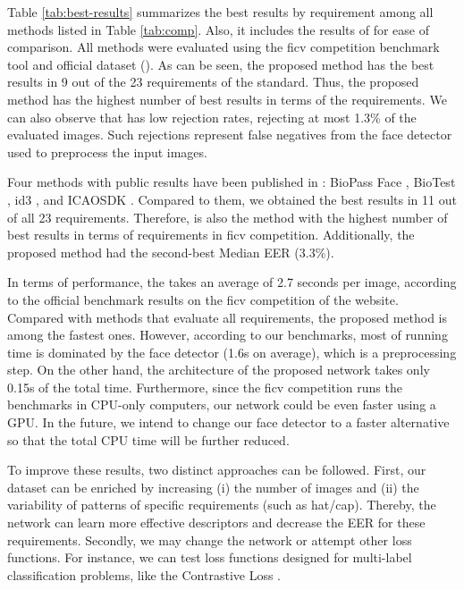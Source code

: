 Table \ref{tab:best-results} summarizes the best results by requirement among all methods listed in Table \ref{tab:comp}. Also, it includes the results of \methodname for ease of comparison. All methods were evaluated using the \acs{ficv} competition benchmark tool and official dataset (\ficvofficial). As can be seen, the proposed method has the best results in 9 out of the 23 requirements of the \icao standard. Thus, the proposed method has the highest number of best results in terms of the requirements. We can also observe that \methodname has low rejection rates, rejecting at most 1.3\% of the evaluated images. Such rejections represent false negatives from the face detector used to preprocess the input images.
 

 
Four methods with public results have been published in \fvcongoing: BioPass Face \citep{fvcVsoft}, BioTest \citep{fvcBioTest}, id3 \citep{fvcICAOCompliance}, and ICAOSDK \citep{fvcSeamfix}. Compared to them, we obtained the best results in 11 out of all 23 requirements. Therefore, \methodname is also the method with the highest number of best results in terms of requirements in \acs{ficv} competition. Additionally, the proposed method had the second-best Median EER (3.3\%).
 
In terms of performance, the \methodname takes an average of 2.7 seconds per image, according to the official benchmark results on the \acs{ficv} competition of the \fvcongoing website. Compared with methods that evaluate all requirements, the proposed method is among the fastest ones. However, according to our benchmarks, most of running time is dominated by the face detector (1.6s on average), which is a preprocessing step. On the other hand, the architecture of the proposed network takes only 0.15s of the total time. Furthermore, since the \acs{ficv} competition runs the benchmarks in CPU-only computers, our network could be even faster using a GPU. In the future, we intend to change our face detector to a faster alternative so that the total CPU time will be further reduced.
 
To improve these results, two distinct approaches can be followed. First, our dataset can be enriched by increasing (i) the number of images and (ii) the variability of patterns of specific requirements (such as hat/cap). Thereby, the network can learn more effective descriptors and decrease the EER for these requirements. Secondly, we may change the network or attempt other loss functions. For instance, we can test loss functions designed for multi-label classification problems, like the Contrastive Loss \citep{khosla2020supervised}.
 
